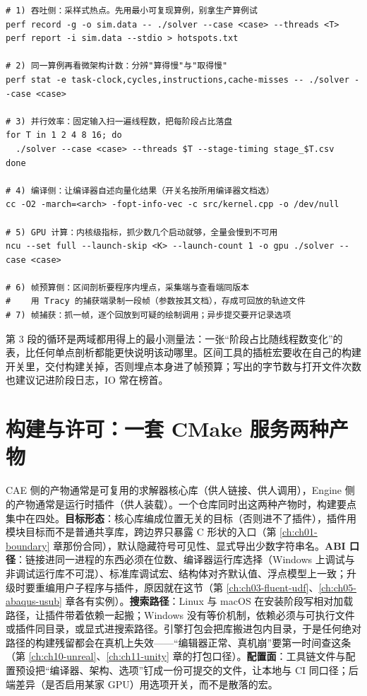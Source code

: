 \documentclass[12pt,a4paper,fontset=fandol]{ctexbook}
\newcommand{\Lang}[1]{\textsf{#1}}
\newcommand{\CL}{\Lang{C}}
\newcommand{\DomCAE}{\Lang{CAE}}
\newcommand{\DomEngine}{\Lang{Engine}}
\begin{document}
\begin{lstlisting}[language=ShellLD, style=shellstyle,
  caption={采集清单：采样、微架构计数、内核指标与帧级记录},
  label={lst:ch17-profile-run}]
# 1) 吞吐侧：采样式热点。先用最小可复现算例，别拿生产算例试
perf record -g -o sim.data -- ./solver --case <case> --threads <T>
perf report -i sim.data --stdio > hotspots.txt

# 2) 同一算例再看微架构计数：分辨"算得慢"与"取得慢"
perf stat -e task-clock,cycles,instructions,cache-misses -- ./solver --case <case>

# 3) 并行效率：固定输入扫一遍线程数，把每阶段占比落盘
for T in 1 2 4 8 16; do
  ./solver --case <case> --threads $T --stage-timing stage_$T.csv
done

# 4) 编译侧：让编译器自述向量化结果（开关名按所用编译器文档选）
cc -O2 -march=<arch> -fopt-info-vec -c src/kernel.cpp -o /dev/null

# 5) GPU 计算：内核级指标，抓少数几个启动就够，全量会慢到不可用
ncu --set full --launch-skip <K> --launch-count 1 -o gpu ./solver --case <case>

# 6) 帧预算侧：区间剖析要程序内埋点，采集端与查看端同版本
#    用 Tracy 的捕获端录制一段帧（参数按其文档），存成可回放的轨迹文件
# 7) 帧捕获：抓一帧，逐个回放到可疑的绘制调用；异步提交要开记录选项
\end{lstlisting}

第 3 段的循环是两域都用得上的最小测量法：一张``阶段占比随线程数变化''的表，比任何单点剖析都能更快说明该动哪里。区间工具的插桩宏要收在自己的构建开关里，交付构建关掉，否则埋点本身进了帧预算；写出的字节数与打开文件次数也建议记进阶段日志，IO 常在榜首。

\section{构建与许可：一套 CMake 服务两种产物}
\label{sec:ch17-build-license}

\DomCAE{} 侧的产物通常是可复用的求解器核心库（供人链接、供人调用），\DomEngine{} 侧的产物通常是运行时插件（供人装载）。一个仓库同时出这两种产物时，构建要点集中在四处。\textbf{目标形态}：核心库编成位置无关的目标（否则进不了插件），插件用模块目标而不是普通共享库，跨边界只暴露 \CL{} 形状的入口（第 \ref{ch:ch01-boundary} 章那份合同），默认隐藏符号可见性、显式导出少数字符串名。\textbf{ABI 口径}：链接进同一进程的东西必须在位数、编译器运行库选择（Windows 上调试与非调试运行库不可混）、标准库调试宏、结构体对齐默认值、浮点模型上一致；升级时要重编用户子程序与插件，原因就在这节（第 \ref{ch:ch03-fluent-udf}、\ref{ch:ch05-abaqus-usub} 章各有实例）。\textbf{搜索路径}：Linux 与 macOS 在安装阶段写相对加载路径，让插件带着依赖一起搬；Windows 没有等价机制，依赖必须与可执行文件或插件同目录，或显式进搜索路径。引擎打包会把库搬进包内目录，于是任何绝对路径的构建残留都会在真机上失效——``编辑器正常、真机崩''要第一时间查这条（第 \ref{ch:ch10-unreal}、\ref{ch:ch11-unity} 章的打包口径）。\textbf{配置面}：工具链文件与配置预设把``编译器、架构、选项''钉成一份可提交的文件，让本地与 CI 同口径；后端差异（是否启用某家 GPU）用选项开关，而不是散落的宏。
\end{document}
